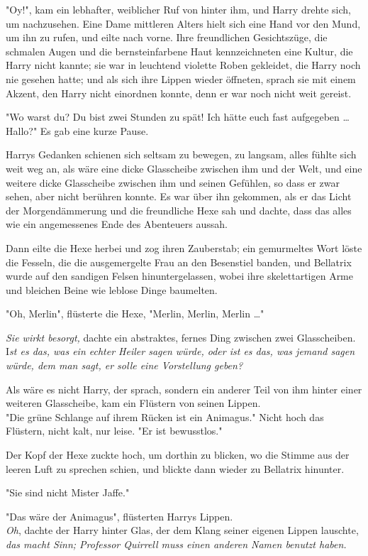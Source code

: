 {"Oy!", kam ein lebhafter, weiblicher Ruf von hinter ihm, und Harry drehte sich, um nachzusehen. Eine Dame mittleren Alters hielt sich eine Hand vor den Mund, um ihn zu rufen, und eilte nach vorne. Ihre freundlichen Gesichtszüge, die schmalen Augen und die bernsteinfarbene Haut kennzeichneten eine Kultur, die Harry nicht kannte; sie war in leuchtend violette Roben gekleidet, die Harry noch nie gesehen hatte; und als sich ihre Lippen wieder öffneten, sprach sie mit einem Akzent, den Harry nicht einordnen konnte, denn er war noch nicht weit gereist.

"Wo warst du? Du bist zwei Stunden zu spät! Ich hätte euch fast aufgegeben … Hallo?" Es gab eine kurze Pause.

Harrys Gedanken schienen sich seltsam zu bewegen, zu langsam, alles fühlte sich weit weg an, als wäre eine dicke Glasscheibe zwischen ihm und der Welt, und eine weitere dicke Glasscheibe zwischen ihm und seinen Gefühlen, so dass er zwar sehen, aber nicht berühren konnte. Es war über ihn gekommen, als er das Licht der Morgendämmerung und die freundliche Hexe sah und dachte, dass das alles wie ein angemessenes Ende des Abenteuers aussah.

Dann eilte die Hexe herbei und zog ihren Zauberstab; ein gemurmeltes Wort löste die Fesseln, die die ausgemergelte Frau an den Besenstiel banden, und Bellatrix wurde auf den sandigen Felsen hinuntergelassen, wobei ihre skelettartigen Arme und bleichen Beine wie leblose Dinge baumelten.

"Oh, Merlin", flüsterte die Hexe, "Merlin, Merlin, Merlin …"

\emph{Sie wirkt besorgt,} dachte ein abstraktes, fernes Ding zwischen zwei Glasscheiben. I\emph{st es das, was ein echter Heiler sagen würde, oder ist es das, was jemand sagen würde, dem man sagt, er solle eine Vorstellung geben?}

Als wäre es nicht Harry, der sprach, sondern ein anderer Teil von ihm hinter einer weiteren Glasscheibe, kam ein Flüstern von seinen Lippen.\\ "Die grüne Schlange auf ihrem Rücken ist ein Animagus." Nicht hoch das Flüstern, nicht kalt, nur leise. "Er ist bewusstlos."

Der Kopf der Hexe zuckte hoch, um dorthin zu blicken, wo die Stimme aus der leeren Luft zu sprechen schien, und blickte dann wieder zu Bellatrix hinunter.

"Sie sind nicht Mister Jaffe."

"Das wäre der Animagus", flüsterten Harrys Lippen.\\ \emph{Oh}, dachte der Harry hinter Glas, der dem Klang seiner eigenen Lippen lauschte, \emph{das macht Sinn; Professor Quirrell muss einen anderen Namen benutzt haben.}

}
